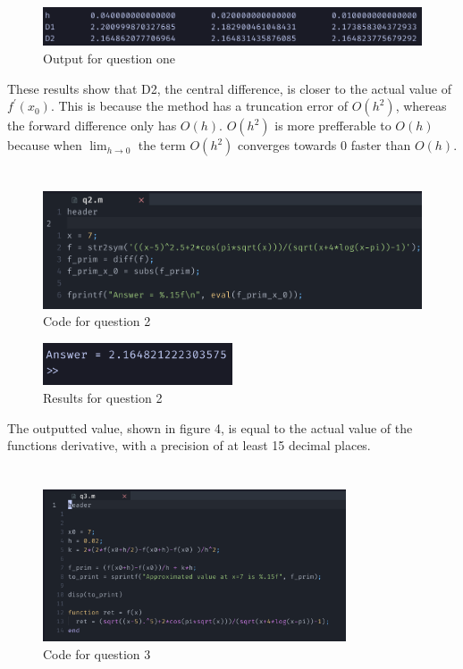 \documentclass{article}
\begin{document}
\begin{figure}[h]
	\centering
	\includegraphics[width=\textwidth]{imgs/q1_results.png}
	\caption{Output for question one}
	\label{fig:q1_results}
\end{figure}

These results show that D2, the central difference, is closer to the actual value of $f^\prime(x_0)$. This is because the method has a
truncation error of $O(h^2)$, whereas the forward difference only has $O(h)$. $O(h^{2})$ is more prefferable to $O(h)$ because when $\lim_{h \to 0}$ the term $O(h^{2})$ converges towards $0$ faster than $O(h)$.

\newpage
\section{}
\begin{figure}[H]
	\centering
	\includegraphics[width=\textwidth{}]{imgs/q2_code.png}
	\caption{Code for question 2}
	\label{fig:q2_code}
\end{figure}

\begin{figure}[H]
	\centering
	\includegraphics[width=0.5\textwidth]{imgs/q2_results.png}
	\caption{Results for question 2}
	\label{fig:q2_results}
\end{figure}
The outputted value, shown in figure 4, is equal to the actual value of the functions derivative, with a precision of at least 15 decimal places.

\newpage
\section{}
\begin{figure}[H]
	\centering
	\includegraphics[width=0.8\textwidth]{imgs/q3_code.png}
	\caption{Code for question 3}
	\label{fig:q3_code}
\end{figure}
\end{document}
